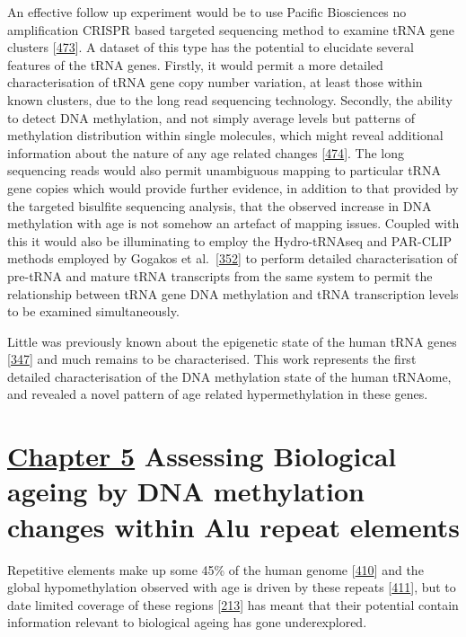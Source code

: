 \documentclass[
]{book}
\begin{document}
An effective follow up experiment would be to use Pacific Biosciences no amplification CRISPR based targeted sequencing method to examine tRNA gene clusters {[}\protect\hyperlink{ref-Wieben2019}{473}{]}.
A dataset of this type has the potential to elucidate several features of the tRNA genes.
Firstly, it would permit a more detailed characterisation of tRNA gene copy number variation, at least those within known clusters, due to the long read sequencing technology.
Secondly, the ability to detect DNA methylation, and not simply average levels but patterns of methylation distribution within single molecules, which might reveal additional information about the nature of any age related changes {[}\protect\hyperlink{ref-Flusberg2010}{474}{]}.
The long sequencing reads would also permit unambiguous mapping to particular tRNA gene copies which would provide further evidence, in addition to that provided by the targeted bisulfite sequencing analysis, that the observed increase in DNA methylation with age is not somehow an artefact of mapping issues.
Coupled with this it would also be illuminating to employ the Hydro-tRNAseq and PAR-CLIP methods employed by Gogakos et al.~{[}\protect\hyperlink{ref-Gogakos2017}{352}{]} to perform detailed characterisation of pre-tRNA and mature tRNA transcripts from the same system to permit the relationship between tRNA gene DNA methylation and tRNA transcription levels to be examined simultaneously.

Little was previously known about the epigenetic state of the human tRNA genes {[}\protect\hyperlink{ref-Bhargava2013a}{347}{]} and much remains to be characterised.
This work represents the first detailed characterisation of the DNA methylation state of the human tRNAome, and revealed a novel pattern of age related hypermethylation in these genes.

\hypertarget{chapter-5-assessing-biological-ageing-by-dna-methylation-changes-within-alu-repeat-elements}{%
\section{\texorpdfstring{\protect\hyperlink{Alus}{Chapter 5} Assessing Biological ageing by DNA methylation changes within Alu repeat elements}{Chapter 5 Assessing Biological ageing by DNA methylation changes within Alu repeat elements}}\label{chapter-5-assessing-biological-ageing-by-dna-methylation-changes-within-alu-repeat-elements}}

Repetitive elements make up some 45\% of the human genome {[}\protect\hyperlink{ref-Jorda2017}{410}{]} and the global hypomethylation observed with age is driven by these repeats {[}\protect\hyperlink{ref-Bollati2010}{411}{]}, but to date limited coverage of these regions {[}\protect\hyperlink{ref-Clark2012}{213}{]} has meant that their potential contain information relevant to biological ageing has gone underexplored.
\end{document}
